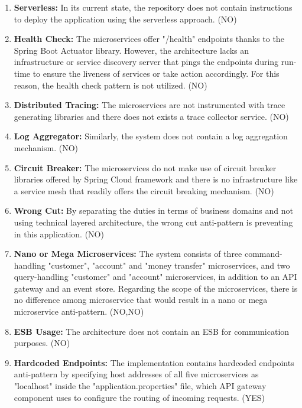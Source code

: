 \documentclass{Configuration_Files/PoliMi3i_thesis}
\begin{document}
\begin{enumerate}
    \item \textbf{Serverless:} In its current state, the repository does not contain instructions to deploy the application using the serverless approach. (NO)
    
    \item \textbf{Health Check:} The microservices offer "/health" endpoints thanks to the Spring Boot Actuator library.
    However, the architecture lacks an infrastructure or service discovery server that pings the endpoints during run-time to ensure the liveness of services or take action accordingly.
    For this reason, the health check pattern is not utilized. (NO)
    
    \item \textbf{Distributed Tracing:} The microservices are not instrumented with trace generating libraries and there does not exists a trace collector service. (NO)
    
    \item \textbf{Log Aggregator:} Similarly, the system does not contain a log aggregation mechanism. (NO)
    
    \item \textbf{Circuit Breaker:} The microservices do not make use of circuit breaker libraries offered by Spring Cloud framework and there is no infrastructure like a service mesh that readily offers the circuit breaking mechanism. (NO)
    
    \item \textbf{Wrong Cut:} By separating the duties in terms of business domains and not using technical layered architecture, the wrong cut anti-pattern is preventing in this application. (NO)
    
    \item \textbf{Nano or Mega Microservices:} The system consists of three command-handling "customer", "account" and "money transfer" microservices,  and two query-handling "customer" and "account" microservices, in addition to an API gateway and an event store.
    Regarding the scope of the microservices, there is no difference among microservice that would result in a nano or mega microservice anti-pattern. (NO,NO)
    
    \item \textbf{ESB Usage:} The architecture does not contain an ESB for communication purposes. (NO)
    
    \item \textbf{Hardcoded Endpoints:} The implementation contains hardcoded endpoints anti-pattern by specifying host addresses of all five microservices as "localhost" inside the "application.properties" file, which API gateway component uses to configure the routing of incoming requests. (YES)
    

\end{enumerate}
\end{document}
